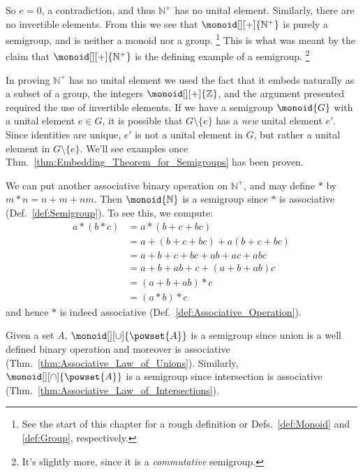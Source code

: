         So $e=0$, a contradiction, and thus $\mathbb{N}^{+}$ has no unital
        element. Similarly, there are no invertible elements. From this we see
        that $\monoid[][+]{\mathbb{N}^{+}}$ is purely a semigroup, and is
        neither a monoid nor a group.%
        \footnote{%
            See the start of this chapter for a rough definition or
            Defs.~\ref{def:Monoid} and \ref{def:Group}, respectively.
        }
        This is what was meant by the claim that $\monoid[][+]{\mathbb{N}^{+}}$
        is the defining example of a semigroup.%
        \footnote{%
            It's slightly more, since it is a \textit{commutative} semigroup.%
        }
        \par\hfill\par
        In proving $\mathbb{N}^{+}$ has no unital element we used the fact that
        it embeds naturally as a subset of a group, the integers
        $\monoid[][+]{\mathbb{Z}}$, and the argument presented required the use
        of invertible elements. If we have a semigroup $\monoid{G}$ with a
        unital element $e\in{G}$, it is possible that $G\setminus\{e\}$ has a
        \textit{new} unital element $e'$. Since identities are unique, $e'$ is
        not a unital element in $G$, but rather a unital element in
        $G\setminus\{e\}$. We'll see examples once
        Thm.~\ref{thm:Embedding_Theorem_for_Semigroups} has been proven.
        \begin{example}
            We can put another associative binary operation on $\mathbb{N}^{+}$,
            and may define $*$ by $m*n=n+m+nm$. Then $\monoid{\mathbb{N}}$ is a
            semigroup since $*$ is associative (Def.~\ref{def:Semigroup}). To
            see this, we compute:
            \begin{align}
                a*(b*c)&=a*(b+c+bc)\\
                    &=a+(b+c+bc)+a(b+c+bc)\\
                    &=a+b+c+bc+ab+ac+abc\\
                    &=a+b+ab+c+(a+b+ab)c\\
                    &=(a+b+ab)*c\\
                    &=(a*b)*c
            \end{align}
            and hence $*$ is indeed associative
            (Def.~\ref{def:Associative_Operation}).
        \end{example}
        \begin{example}
            Given a set $A$, $\monoid[][\cup]{\powset{A}}$ is a semigroup
            since union is a well defined binary operation and moreover is
            associative (Thm.~\ref{thm:Associative_Law_of_Unions}). Similarly,
            $\monoid[][\cap]{\powset{A}}$ is a semigroup since intersection is
            associative (Thm.~\ref{thm:Associative_Law_of_Intersections}).
        \end{example}
